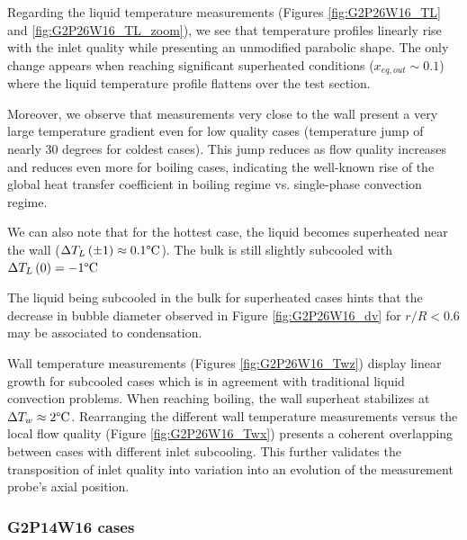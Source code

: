 Regarding the liquid temperature measurements (Figures \ref{fig:G2P26W16_TL} and \ref{fig:G2P26W16_TL_zoom}), we see that temperature profiles linearly rise with the inlet quality while presenting an unmodified parabolic shape. The only change appears when reaching significant superheated conditions ($x_{eq,out} \sim 0.1$) where the liquid temperature profile flattens over the test section. 

Moreover, we observe that measurements very close to the wall present a very large temperature gradient even for low quality cases (temperature jump of nearly 30 degrees for coldest cases). This jump reduces as flow quality increases and reduces even more for boiling cases, indicating the well-known rise of the global heat transfer coefficient in boiling regime vs. single-phase convection regime.

We can also note that for the hottest case, the liquid becomes superheated near the wall ($\Delta T_{L}\left( \pm 1 \right) \approx 0.1\degree\mathrm{C}$). The bulk is still slightly subcooled with $\Delta T_{L}\left( 0 \right) = -1\degree\mathrm{C}$

\begin{remark*}{}
The liquid being subcooled in the bulk for superheated cases hints that the decrease in bubble diameter observed in Figure \ref{fig:G2P26W16_dv} for $r/R < 0.6$ may be associated to condensation.
\end{remark*}

\npar

Wall temperature measurements (Figures \ref{fig:G2P26W16_Twz}) display linear growth for subcooled cases which is in agreement with traditional liquid convection problems. When reaching boiling, the wall superheat stabilizes at $\Delta T_{w} \approx 2\degree\mathrm{C}$.
Rearranging the different wall temperature measurements versus the local flow quality (Figure \ref{fig:G2P26W16_Twx}) presents a coherent overlapping between cases with different inlet subcooling. This further validates the transposition of inlet quality into variation into an evolution of the measurement probe's axial position.


\subsubsection{G2P14W16 cases}


